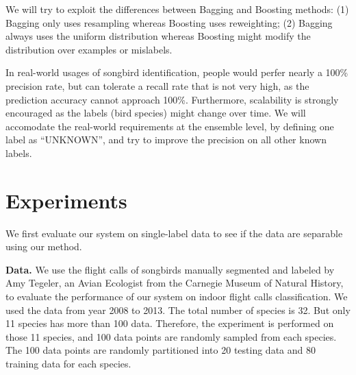 \documentclass[12pt,peerreview,letterpaper]{IEEEtran}
\begin{document}
We will try to exploit the differences between Bagging and Boosting methods: (1) Bagging only uses resampling whereas Boosting uses reweighting; (2) Bagging always uses the uniform distribution whereas Boosting might modify the distribution over examples or mislabels.

In real-world usages of songbird identification, people would perfer nearly a 100\% precision rate, but can tolerate a  recall rate that is not very high, as the prediction accuracy cannot approach 100\%. Furthermore, scalability is strongly encouraged as the labels (bird species) might change over time. We will accomodate the real-world requirements at the ensemble level, by defining one label as ``UNKNOWN'', and try to improve the precision on all other known labels.


\section{Experiments}

We first evaluate our system on single-label data to see if the data are separable using our method.


\textbf{Data.}  We use the flight calls of songbirds manually segmented and labeled by Amy Tegeler, an Avian Ecologist from the Carnegie Museum of Natural History, to evaluate the performance of our system on indoor flight calls classification. We used the data from year 2008 to 2013. The total number of species is 32. But only 11 species has more than 100 data. Therefore, the experiment is performed on those 11 species, and 100 data points are randomly sampled from each species. The 100 data points are randomly partitioned into 20 testing data and 80 training data for each species.
\end{document}
